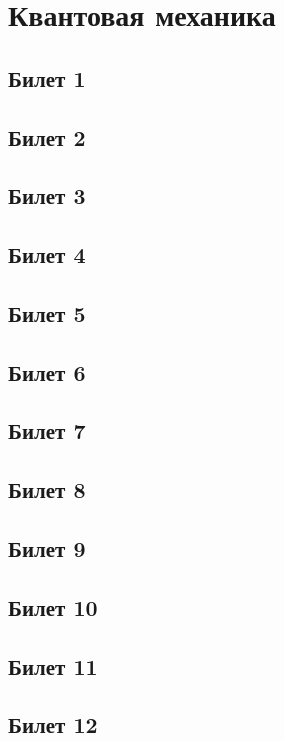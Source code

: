 


\tableofcontents
\newpage

\section{Квантовая механика} %
\subsection{Билет 1} 

\subsection{Билет 2}

\subsection{Билет 3}

\subsection{Билет 4}

\subsection{Билет 5}

\subsection{Билет 6}

\subsection{Билет 7}

\subsection{Билет 8}

\subsection{Билет 9}

\subsection{Билет 10}

\subsection{Билет 11}

\subsection{Билет 12}

